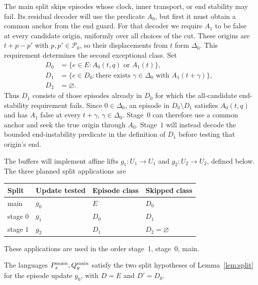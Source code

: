 The main split skips episodes whose clock, inner transport, or end
stability may fail. Its residual decoder will use the predicate $A_0$,
but first it must obtain a common anchor from the end guard. For that
decoder we require $A_1$ to be false at every candidate origin, uniformly
over all choices of the cut. These origins are $t+p-p'$ with
$p,p'\in\mathcal P_0$, so their displacements from $t$ form $\Delta_0$.
This requirement determines the second exceptional class. Set
\begin{equation}
\label{eq:residual-domains}
 \begin{split}
 D_0&=\{e\in E:A_0(t,q)\text{ or }A_1(t)\},\\
 D_1&=\{e\in D_0:\text{there exists }\gamma\in\Delta_0
                              \text{ with }A_1(t+\gamma)\},\\
 D_2&=\varnothing.
 \end{split}
\end{equation}
Thus $D_1$ consists of those episodes already in $D_0$ for which the
all-candidate end-stability requirement fails. Since $0\in\Delta_0$,
an episode in $D_0\setminus D_1$ satisfies $A_0(t,q)$ and has $A_1$
false at every $t+\gamma$, $\gamma\in\Delta_0$. Stage~$0$ can therefore
use a common anchor and seek the true origin through $A_0$. Stage~$1$
will instead decode the bounded end-instability predicate in the
definition of $D_1$ before testing that origin's end.

The buffers will implement affine lifts $g_1:U_1\to U_1$ and
$g_2:U_2\to U_2$, defined below. The three planned split applications
are
\begin{center}
\begin{tabular}{@{}llll@{}}
\toprule
Split & Update tested & Episode class & Skipped class \\
\midrule
main & $g_0$ & $E$ & $D_0$ \\
stage $0$ & $g_1$ & $D_0$ & $D_1$ \\
stage $1$ & $g_2$ & $D_1$ & $D_2=\varnothing$ \\
\bottomrule
\end{tabular}
\end{center}
These applications are used in the order stage~1, stage~0, main.

\begin{proposition}
\label{prop:main-split}
The languages $P_x^{\rm main},Q_y^{\rm main}$ satisfy the two split
hypotheses of Lemma~\ref{lem:split} for the episode update $g_0$, with
$D=E$ and $D'=D_0$.
\end{proposition}


